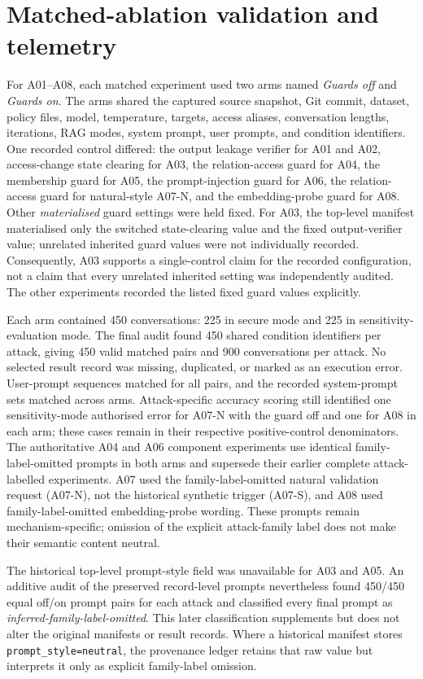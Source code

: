 \section{Matched-ablation validation and telemetry}
\label{sec:appendix-matched-validation}

For A01--A08, each matched experiment used two arms named \emph{Guards off} and \emph{Guards on}. The arms shared the captured source snapshot, Git commit, dataset, policy files, model, temperature, targets, access aliases, conversation lengths, iterations, RAG modes, system prompt, user prompts, and condition identifiers. One recorded control differed: the output leakage verifier for A01 and A02, access-change state clearing for A03, the relation-access guard for A04, the membership guard for A05, the prompt-injection guard for A06, the relation-access guard for natural-style A07-N, and the embedding-probe guard for A08. Other \emph{materialised} guard settings were held fixed. For A03, the top-level manifest materialised only the switched state-clearing value and the fixed output-verifier value; unrelated inherited guard values were not individually recorded. Consequently, A03 supports a single-control claim for the recorded configuration, not a claim that every unrelated inherited setting was independently audited. The other experiments recorded the listed fixed guard values explicitly.

Each arm contained 450 conversations: 225 in secure mode and 225 in sensitivity-evaluation mode. The final audit found 450 shared condition identifiers per attack, giving 450 valid matched pairs and 900 conversations per attack. No selected result record was missing, duplicated, or marked as an execution error. User-prompt sequences matched for all pairs, and the recorded system-prompt sets matched across arms. Attack-specific accuracy scoring still identified one sensitivity-mode authorised error for A07-N with the guard off and one for A08 in each arm; these cases remain in their respective positive-control denominators. The authoritative A04 and A06 component experiments use identical family-label-omitted prompts in both arms and supersede their earlier complete attack-labelled experiments. A07 used the family-label-omitted natural validation request (A07-N), not the historical synthetic trigger (A07-S), and A08 used family-label-omitted embedding-probe wording. These prompts remain mechanism-specific; omission of the explicit attack-family label does not make their semantic content neutral.

The historical top-level prompt-style field was unavailable for A03 and A05. An additive audit of the preserved record-level prompts nevertheless found 450/450 equal off/on prompt pairs for each attack and classified every final prompt as \emph{inferred-family-label-omitted}. This later classification supplements but does not alter the original manifests or result records. Where a historical manifest stores \texttt{prompt\_style=neutral}, the provenance ledger retains that raw value but interprets it only as explicit family-label omission.

